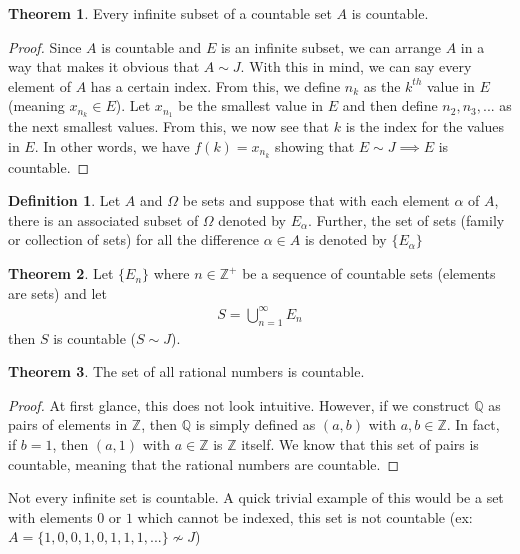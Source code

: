 \documentclass[14pt]{extarticle}
\theoremstyle{definition}
\newtheorem{definition}{Definition}[section]
\newtheorem{theorem}{Theorem}[section]
\begin{document}
\pagebreak
\begin{theorem}
    Every infinite subset of a countable set $A$ is countable.

    \begin{proof}
        Since $A$ is countable and $E$ is an infinite subset, we can arrange $A$ in a way that makes it obvious that $A\sim J$. 
        With this in mind, we can say every element of $A$ has a certain index. From this, we define $n_k$ as the $k^{th}$ value 
        in $E$ (meaning $x_{n_k} \in E$). Let $x_{n_1}$ be the smallest value in $E$ and then define $n_2, n_3, ...$ as the next
        smallest values. From this, we now see that $k$ is the index for the values in $E$. In other words, we have $f(k) = x_{n_k}$
        showing that $E\sim J\implies E$ is countable.
    \end{proof}
\end{theorem}

\begin{definition}
    Let $A$ and $\Omega$ be sets and suppose that with each element $\alpha$ of $A$, there is an associated subset of $\Omega$
    denoted by $E_\alpha$. Further, the set of sets (family or collection of sets) for all the difference $\alpha\in A$ is denoted
    by $\{E_\alpha\}$
\end{definition}

\begin{theorem}
    Let $\{E_n\}$ where $n\in \mathbb{Z}^+$ be a sequence of countable sets (elements are sets) and let
    \begin{align*}
        S = \bigcup_{n=1}^\infty E_n
    \end{align*}
    then $S$ is countable ($S\sim J$).
\end{theorem}

\begin{theorem}
    The set of all rational numbers is countable.

    \begin{proof}
        At first glance, this does not look intuitive. However, if we construct $\mathbb{Q}$ as pairs of elements in $\mathbb{Z}$, then
        $\mathbb{Q}$ is simply defined as $(a, b)$ with $a, b\in \mathbb{Z}$. In fact, if $b = 1$, then $(a, 1)$ with $a\in \mathbb{Z}$
        is $\mathbb{Z}$ itself. We know that this set of pairs is countable, meaning that the rational numbers are countable.
    \end{proof}
\end{theorem}

Not every infinite set is countable. A quick trivial example of this would be a set with elements $0$ or $1$ which cannot be indexed, this
set is not countable (ex: $A = \{1, 0, 0, 1, 0, 1, 1, 1, ...\} \not\sim J$)
\end{document}
